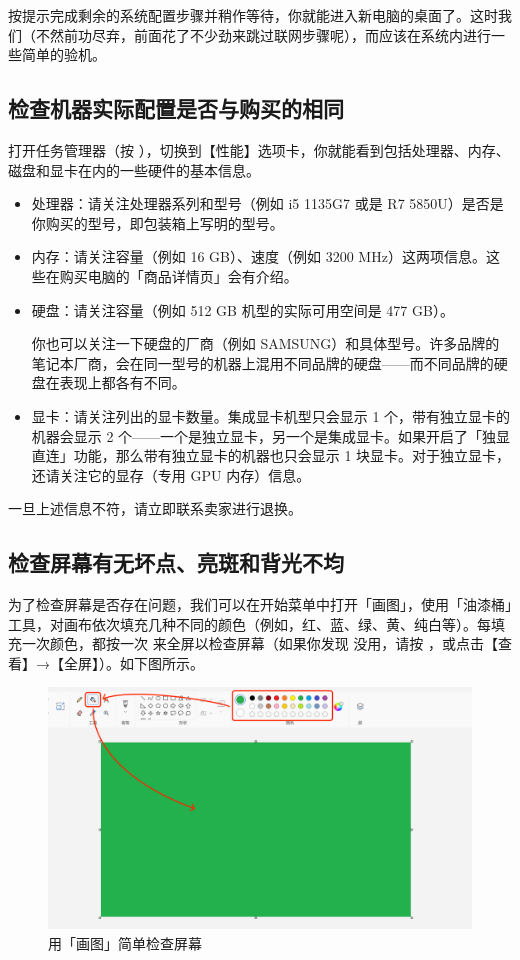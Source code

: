 按提示完成剩余的系统配置步骤并稍作等待，你就能进入新电脑的桌面了。这时我们（不然前功尽弃，前面花了不少劲来跳过联网步骤呢），而应该在系统内进行一些简单的验机。

\subsection{检查机器实际配置是否与购买的相同}

打开任务管理器（按 ），切换到【性能】选项卡，你就能看到包括处理器、内存、磁盘和显卡在内的一些硬件的基本信息。

\begin{itemize}
  \item 处理器：请关注处理器系列和型号（例如 i5 1135G7 或是 R7 5850U）是否是你购买的型号，即包装箱上写明的型号。
  \item 内存：请关注容量（例如 16 GB）、速度（例如 3200 MHz）这两项信息。这些在购买电脑的「商品详情页」会有介绍。
  \item 硬盘：请关注容量（例如 512 GB 机型的实际可用空间是 477 GB）。
    \begin{note}
      你也可以关注一下硬盘的厂商（例如 SAMSUNG）和具体型号。许多品牌的笔记本厂商，会在同一型号的机器上混用不同品牌的硬盘——而不同品牌的硬盘在表现上都各有不同。
    \end{note}
  \item 显卡：请关注列出的显卡数量。集成显卡机型只会显示 1 个，带有独立显卡的机器会显示 2 个——一个是独立显卡，另一个是集成显卡。如果开启了「独显直连」功能，那么带有独立显卡的机器也只会显示 1 块显卡。对于独立显卡，还请关注它的显存（专用 GPU 内存）信息。
\end{itemize}

一旦上述信息不符，请立即联系卖家进行退换。

\subsection{检查屏幕有无坏点、亮斑和背光不均}

为了检查屏幕是否存在问题，我们可以在开始菜单中打开「画图」，使用「油漆桶」工具，对画布依次填充几种不同的颜色（例如，红、蓝、绿、黄、纯白等）。每填充一次颜色，都按一次  来全屏以检查屏幕（如果你发现  没用，请按 ，或点击【查看】→【全屏】）。如下图所示。

\begin{figure}[htb!]
  \centering
  \includegraphics[width=.75\textwidth]{assets/appendix/Paint.png}
  \caption{用「画图」简单检查屏幕}
  \label{fig:Paint}
\end{figure}

